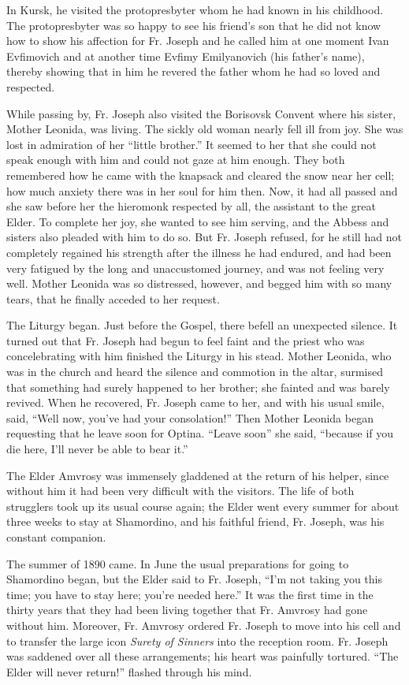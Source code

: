 In Kursk, he visited the protopresbyter whom he had known in his childhood. The protopresbyter was so happy to see his friend's son that he did not know how to show his affection for Fr. Joseph and he called him at one moment Ivan Evfimovich and at another time Evfimy Emilyanovich (his father's name), thereby showing that in him he revered the father whom he had so loved and respected.

While passing by, Fr. Joseph also visited the Borisovsk Convent where his sister, Mother Leonida, was living. The sickly old woman nearly fell ill from joy. She was lost in admiration of her ``little brother.'' It seemed to her that she could not speak enough with him and could not gaze at him enough. They both remembered how he came with the knapsack and cleared the snow near her cell; how much anxiety there was in her soul for him then. Now, it had all passed and she saw before her the hieromonk respected by all, the assistant to the great Elder. To complete her joy, she wanted to see him serving, and the Abbess and sisters also pleaded with him to do so. But Fr. Joseph refused, for he still had not completely regained his strength after the illness he had endured, and had been very fatigued by the long and unaccustomed journey, and was not feeling very well. Mother Leonida was so distressed, however, and begged him with so many tears, that he finally acceded to her request.

The Liturgy began. Just before the Gospel, there befell an unexpected silence. It turned out that Fr. Joseph had begun to feel faint and the priest who was concelebrating with him finished the Liturgy in his stead. Mother Leonida, who was in the church and heard the silence and commotion in the altar, surmised that something had surely happened to her brother; she fainted and was barely revived. When he recovered, Fr. Joseph came to her, and with his usual smile, said, ``Well now, you've had your consolation!'' Then Mother Leonida began requesting that he leave soon for Optina. ``Leave soon'' she said, ``because if you die here, I'll never be able to bear it.''

The Elder Amvrosy was immensely gladdened at the return of his helper, since without him it had been very difficult with the visitors. The life of both strugglers took up its usual course again; the Elder went every summer for about three weeks to stay at Shamordino, and his faithful friend, Fr. Joseph, was his constant companion.

The summer of 1890 came. In June the usual preparations for going to Shamordino began, but the Elder said to Fr. Joseph, ``I'm not taking you this time; you have to stay here; you’re needed here.'' It was the first time in the thirty years that they had been living together that Fr. Amvrosy had gone without him. Moreover, Fr. Amvrosy ordered Fr. Joseph to move into his cell and to transfer the large icon \textit{Surety of Sinners} into the reception room. Fr. Joseph was saddened over all these arrangements; his heart was painfully tortured. ``The Elder will never return!'' flashed through his mind.

